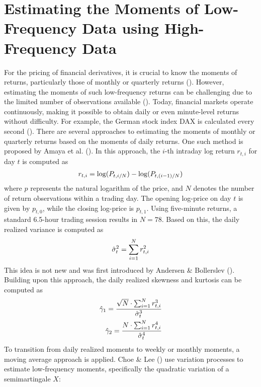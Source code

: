 \section{Estimating the Moments of Low-Frequency Data using High-Frequency Data}
For the pricing of financial derivatives, it is crucial to know the moments of returns, particularly those of monthly or quarterly returns (\cite{barroRareDisastersAsset2006}). However, estimating the moments of such low-frequency returns can be challenging due to the limited number of observations available (\cite{neubergerSkewnessStockMarket2021}). Today, financial markets operate continuously, making it possible to obtain daily or even minute-level returns without difficulty. For example, the German stock index DAX is calculated every second (\cite{boersefrankfurtFunktioniertBoerse}). There are several approaches to estimating the moments of monthly or quarterly returns based on the moments of daily returns. One such method is proposed by Amaya et al. (\citeyear{amayaDoesRealizedSkewness2015}). In this approach, the $i$-th intraday log return $r_{t,i}$ for day $t$ is computed as
\begin{align}
    r_{t,i} = \log(P_{t,i/N}) - \log(P_{t,(i-1)/N})\notag
\end{align}
where $p$ represents the natural logarithm of the price, and $N$ denotes the number of return observations within a trading day. The opening log-price on day $t$ is given by $p_{t,0}$, while the closing log-price is $p_{t,1}$. Using five-minute returns, a standard 6.5-hour trading session results in $N = 78$. Based on this, the daily realized variance is computed as
\begin{align}
    \hat{\sigma}^2_t = \sum_{i=1}^{N}r_{t,i}^2\notag
\end{align}
This idea is not new and was first introduced by Andersen \& Bollerslev (\citeyear{andersenAnsweringSkepticsYes1998}). Building upon this approach, the daily realized skewness and kurtosis can be computed as
\begin{align}
    \hat{\gamma}_1 = \frac{\sqrt{N}\cdot \sum_{i=1}^{N}r_{t,i}^3}{\hat{\sigma}_t^3}\notag\\
    \hat{\gamma}_2 = \frac{N\cdot \sum_{i=1}^{N}r_{t,i}^4}{\hat{\sigma}_t^4}\notag
\end{align}
To transition from daily realized moments to weekly or monthly moments, a moving average approach is applied. Choe \& Lee (\citeyear{choeHighMomentVariations2014}) use variation processes to estimate low-frequency moments, specifically the quadratic variation of a semimartingale $X$:
